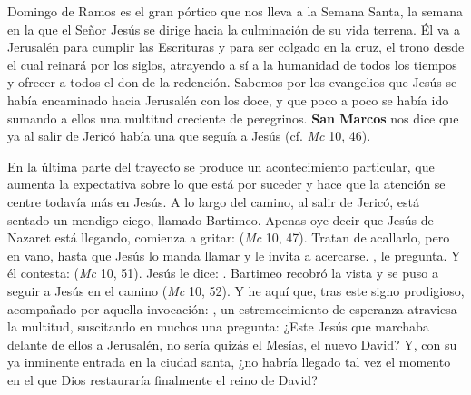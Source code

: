 \begin{body}
 Domingo de Ramos es el gran pórtico que nos lleva a la Semana Santa, la semana en la que el Señor Jesús se dirige hacia la culminación de su vida terrena. Él va a Jerusalén para cumplir las Escrituras y para ser colgado en la cruz, el trono desde el cual reinará por los siglos, atrayendo a sí a la humanidad de todos los tiempos y ofrecer a todos el don de la redención. Sabemos por los evangelios que Jesús se había encaminado hacia Jerusalén con los doce, y que poco a poco se había ido sumando a ellos una multitud creciente de peregrinos. \textbf{San Marcos} nos dice que ya al salir de Jericó había una  que seguía a Jesús (cf. \textit{Mc} 10, 46).

En la última parte del trayecto se produce un acontecimiento particular, que aumenta la expectativa sobre lo que está por suceder y hace que la atención se centre todavía más en Jesús. A lo largo del camino, al salir de Jericó, está sentado un mendigo ciego, llamado Bartimeo. Apenas oye decir que Jesús de Nazaret está llegando, comienza a gritar:  (\textit{Mc} 10, 47). Tratan de acallarlo, pero en vano, hasta que Jesús lo manda llamar y le invita a acercarse. , le pregunta. Y él contesta:  (\textit{Mc} 10, 51). Jesús le dice: . Bartimeo recobró la vista y se puso a seguir a Jesús en el camino (\textit{Mc} 10, 52). Y he aquí que, tras este signo prodigioso, acompañado por aquella invocación: , un estremecimiento de esperanza atraviesa la multitud, suscitando en muchos una pregunta: ¿Este Jesús que marchaba delante de ellos a Jerusalén, no sería quizás el Mesías, el nuevo David? Y, con su ya inminente entrada en la ciudad santa, ¿no habría llegado tal vez el momento en el que Dios restauraría finalmente el reino de David?


\end{body}
